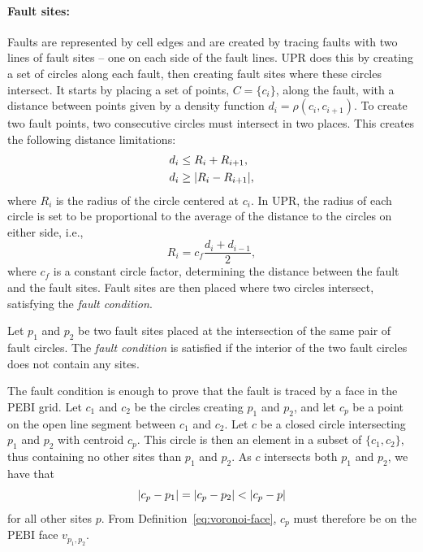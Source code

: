 \paragraph{Fault sites:}
\label{UPR:faults}
Faults are represented by cell edges and are created by tracing faults with two lines of fault sites -- one on each side of the fault lines. UPR does this by creating a set of circles along each fault, then creating fault sites where these circles intersect. It starts by placing a set of points, $C = \{c_i\}$, along the fault, with a distance between points given by a density function $d_i = \rho(c_i, c_{i+1})$. To create two fault points, two consecutive circles must intersect in two places. This creates the following distance limitations:
\begin{align}
    d_i &\le R_i + R_{i+1},  \label{eq:fault_distance_le}\\
    d_i &\ge \lvert R_i - R_{i+1}\rvert,  \label{eq:fault_distance_ge}
\end{align}
where $R_i$ is the radius of the circle centered at $c_i$. In UPR, the radius of each circle is set to be proportional to the average of the distance to the circles on either side, i.e.,
\begin{equation}
    R_i = c_f \frac{d_i + d_{i-1}}{2},
\end{equation}
where $c_f$ is a constant circle factor, determining the distance between the fault and the fault sites. Fault sites are then placed where two circles intersect, satisfying the \emph{fault condition}.

\begin{definition}
Let $p_1$ and $p_2$ be two fault sites placed at the intersection of the same pair of fault circles. The \emph{fault condition} is satisfied if the interior of the two fault circles does not contain any sites.
\end{definition}

The fault condition is enough to prove that the fault is traced by a face in the PEBI grid. Let $c_1$ and $c_2$ be the circles creating $p_1$ and $p_2$, and let $c_p$ be a point on the open line segment between $c_1$ and $c_2$. Let $c$ be a closed circle intersecting $p_1$ and $p_2$ with centroid $c_p$. This circle is then an element in a subset of $\{c_1, c_2\}$, thus containing no other sites than $p_1$ and $p_2$. As $c$ intersects both $p_1$ and $p_2$, we have that
\begin{equation*}
    \lvert c_p - p_1\rvert = \lvert c_p - p_2\rvert < \lvert c_p - p\rvert
\end{equation*}
for all other sites $p$. From Definition~\ref{eq:voronoi-face}, $c_p$ must therefore be on the PEBI face $v_{p_1, p_2}$.

